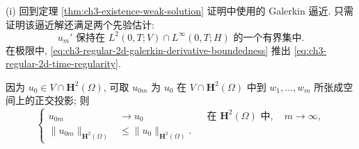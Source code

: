 \begin{Proof}
(i) 回到定理 \ref{thm:ch3-existence-weak-solution} 证明中使用的 Galerkin 逼近. 只需证明该逼近解还满足两个先验估计:
\begin{equation}
u_m'\text{ 保持在 }L^2(0,T;V)\cap L^\infty(0,T;H)\text{ 的一个有界集中}.
\label{eq:ch3-regular-2d-galerkin-derivative-boundedness}
\end{equation}
在极限中, \eqref{eq:ch3-regular-2d-galerkin-derivative-boundedness} 推出 \eqref{eq:ch3-regular-2d-time-regularity}.

因为 $u_0\in V\cap\mathbf H^2(\Omega)$, 可取 $u_{0m}$ 为 $u_0$ 在 $V\cap\mathbf H^2(\Omega)$ 中到 $w_1,\ldots,w_m$ 所张成空间上的正交投影; 则
\begin{equation}
\left\{
\begin{aligned}
u_{0m}&\longrightarrow u_0&&\text{在 }\mathbf H^2(\Omega)\text{ 中},\quad m\to\infty,\\
\lVert u_{0m}\rVert_{\mathbf H^2(\Omega)}&\leq\lVert u_0\rVert_{\mathbf H^2(\Omega)}.
\end{aligned}
\right.
\label{eq:ch3-regular-2d-initial-projection}
\end{equation}


\end{Proof}
